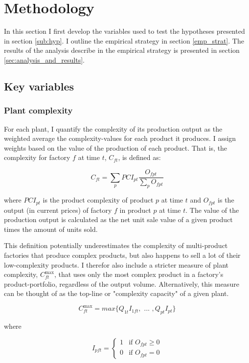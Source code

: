 \documentclass[11pt]{article}
\begin{document}
\newpage

\section{Methodology}%
\label{sub:methodology}
In this section I first develop the variables used to test the hypotheses presented in section \ref{sub:hyp}. I outline the empirical strategy in section \ref{emp_strat}. The results of the analysis describe in the empirical strategy is presented in section \ref{sec:analysis_and_results}.

\subsection{Key variables}%
\label{sub:key_variables}

\subsubsection{Plant complexity}%
\label{sub:plant_complexity}

For each plant, I quantify the complexity of its production output as the weighted average the complexity-values for each product it produces. I assign weights based on the value of the production of each product. That is, the complexity for factory \(f\) at time \(t\), \(C_{ft}\), is defined as:

\[
C_{ft} = \sum_p PCI_{pt} \frac{O_{fpt}}{\sum_p O_{fpt}}
\] 

where \(PCI_{pt}\) is the product complexity of product \(p\) at time \(t\) and \(O_{fpt}\) is the output (in current prices) of factory \(f\) in product \(p\) at time \(t\). The value of the production output is calculated as the net unit sale value of a given product times the amount of units sold. 

This definition potentially underestimates the complexity of multi-product factories that produce complex products, but also happens to sell a lot of their low-complexity products. I therefor also include a stricter measure of plant complexity, \(C^{\text{max}}_{ft}\), that uses only the most complex product in a factory's product-portfolio, regardless of the output volume. Alternatively, this measure can be thought of as the top-line or "complexity capacity" of a given plant. 

\[
C^{\text{max}}_{ft} = max \{ Q_{1t} I_{1ft}, \text{ ... }, Q_{pt} I_{pt} \}
\]

where

\[
I_{pft} = \begin{cases}
 1 & \text{if } O_{fpt} \geq 0 \\
 0 & \text{if } O_{fpt} = 0
\end{cases}
\]
\end{document}
